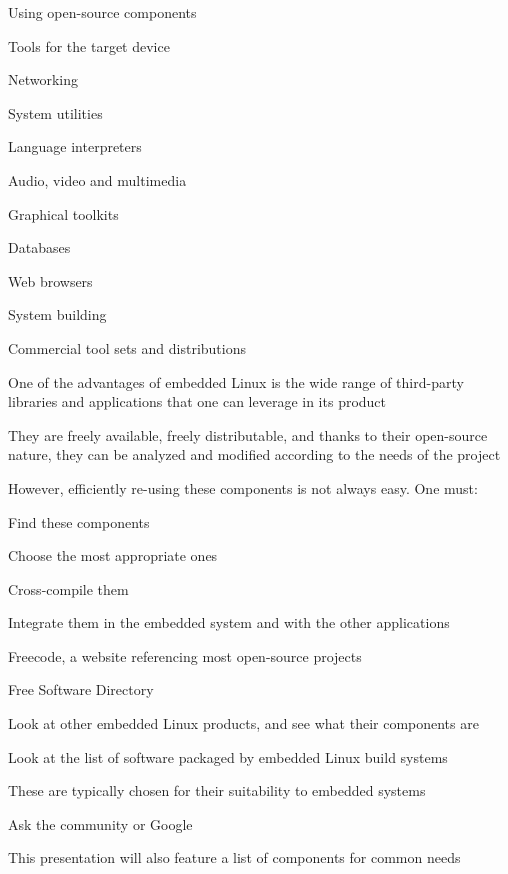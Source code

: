   \startitemize
  \item Using open-source components
  \item Tools for the target device
    \startitemize
    \item Networking
    \item System utilities
    \item Language interpreters
    \item Audio, video and multimedia
    \item Graphical toolkits
    \item Databases
    \item Web browsers
    \stopitemize
  \item System building
  \item Commercial tool sets and distributions
  \stopitemize

  \startitemize
  \item One of the advantages of embedded Linux is the wide range of
    third-party libraries and applications that one can leverage in
    its product
    \startitemize
    \item They are freely available, freely distributable, and thanks
      to their open-source nature, they can be analyzed and modified
      according to the needs of the project
    \stopitemize
  \item However, efficiently re-using these components is not always
    easy. One must:
    \startitemize
    \item Find these components
    \item Choose the most appropriate ones
    \item Cross-compile them
    \item Integrate them in the embedded system and with the other
      applications
    \stopitemize
  \stopitemize

  \startitemize
  \item Freecode, a website referencing most open-source projects\\
  \item Free Software Directory\\
  \item Look at other embedded Linux products, and see what their
    components are
  \item Look at the list of software packaged by embedded Linux build
    systems
    \startitemize
    \item These are typically chosen for their suitability to embedded
      systems
    \stopitemize
  \item Ask the community or Google
  \item This presentation will also feature a list of components for
    common needs
  \stopitemize

